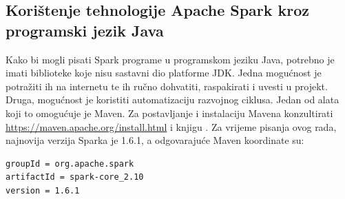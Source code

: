 \documentclass[times, utf8, zavrsni, numeric]{fer}
\begin{document}
\subsection{Korištenje tehnologije Apache Spark kroz programski jezik Java}
Kako bi mogli pisati Spark programe u programskom jeziku Java, potrebno je imati biblioteke koje nisu sastavni dio platforme JDK.
Jedna mogućnost je potražiti ih na internetu te ih ručno dohvatiti, raspakirati i uvesti u projekt. Druga, mogućnost je koristiti automatizaciju razvojnog ciklusa. Jedan od alata koji to omogućuje je Maven. Za postavljanje i instalaciju Mavena konzultirati \url{https://maven.apache.org/install.html} i knjigu \cite{marcupic}. Za vrijeme pisanja ovog rada, najnovija verzija Sparka je 1.6.1, a odgovarajuće Maven koordinate su:
\begin{lstlisting}[language=bash, basicstyle=\small]
groupId = org.apache.spark
artifactId = spark-core_2.10
version = 1.6.1
\end{lstlisting}
\end{document}

